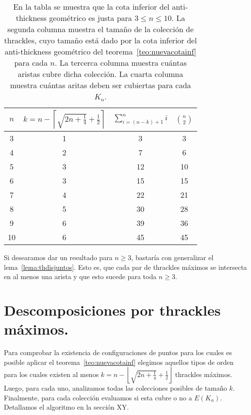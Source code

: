\begin{table}[t]
  \centering
  \begin{tabular}{|c|c|c|c|}
    \hline
    $n$ & $k=n - \left\lceil\sqrt{2n+\frac{1}{4}} + \frac{1}{2}\right\rceil$ & $\sum^n_{i=(n-k) + 1}i$ & $\binom{n}{2}$\\[5pt] \hline\hline
    3   & 1  & 3 & 3 \\ \hline
    4   & 2  & 7 & 6 \\ \hline
    5   & 3  & 12 & 10 \\ \hline
    6   & 3  & 15 & 15 \\ \hline
    7   & 4  & 22 & 21 \\ \hline
    8   & 5  & 30 & 28 \\ \hline
    9   & 6  & 39 & 36 \\ \hline
    10  & 6  & 45 & 45 \\ \hline
  \end{tabular}
  \caption{En la tabla se muestra que la cota inferior del anti-thickness
  geométrico es justa para $3 \leq n \leq 10$. La segunda columna muestra el
  tamaño de la colección de thrackles, cuyo tamaño está dado por la cota
  inferior del anti-thickness geométrico del teorema~\ref{teo:nuevacotainf}
  para cada $n$. La tercerca columna muestra cuántas aristas cubre dicha
  colección. La cuarta columna muestra cuántas aritas deben ser cubiertas para
  cada $K_n$.}
  \label{table:atnuevacota}
\end{table}

  Si desearamos dar un resultado para $n\geq 3$, bastaría con generalizar el
  lema~\ref{lema:thdisjuntos}. Esto es, que cada par de thrackles máximos se
  intersecta en al menos una arista y que esto sucede para toda $n\geq 3$.

\section{Descomposiciones por thrackles máximos.}

  Para comprobar la existencia de configuraciones de puntos para los cuales es
  posible aplicar el teorema~\ref{teo:nuevacotainf} elegimos aquellos tipos de
  orden para los cuales existen al menos $k=n -
  \left\lfloor\sqrt{2n+\frac{1}{4}} + \frac{1}{2}\right\rfloor$ thrackles
  máximos. Luego, para cada uno, analizamos todas las colecciones posibles de
  tamaño $k$. Finalmente, para cada colección evaluamos si esta cubre o no a
  $E(K_n)$. Detallamos el algoritmo en la sección XY. %

